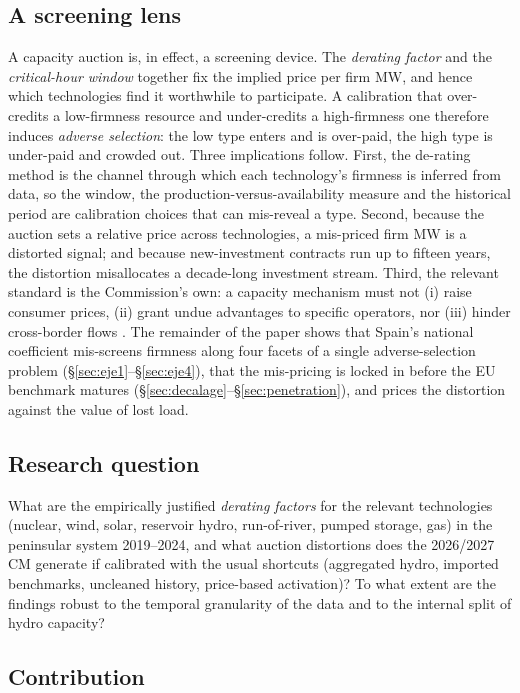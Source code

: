 \documentclass[11pt,a4paper]{article}
\begin{document}
\subsection{A screening lens}

A capacity auction is, in effect, a screening device. The \emph{derating factor} and
the \emph{critical-hour window} together fix the implied price per firm MW, and hence
which technologies find it worthwhile to participate. A calibration that over-credits a
low-firmness resource and under-credits a high-firmness one therefore induces
\emph{adverse selection}: the low type enters and is over-paid, the high type is
under-paid and crowded out. Three implications follow. First, the de-rating method is
the channel through which each technology's firmness is inferred from data, so the
window, the production-versus-availability measure and the historical period are
calibration choices that can mis-reveal a type. Second, because the auction sets a
relative price across technologies, a mis-priced firm MW is a distorted signal; and
because new-investment contracts run up to fifteen years, the distortion misallocates a
decade-long investment stream. Third, the relevant standard is the Commission's own: a
capacity mechanism must not (i) raise consumer prices, (ii) grant undue advantages to
specific operators, nor (iii) hinder cross-border flows \citep{ec2026sa112483}. The
remainder of the paper shows that Spain's national coefficient mis-screens firmness
along four facets of a single adverse-selection problem
(\S\ref{sec:eje1}--\S\ref{sec:eje4}), that the mis-pricing is locked in before the EU
benchmark matures (\S\ref{sec:decalage}--\S\ref{sec:penetration}), and prices the
distortion against the value of lost load.

\subsection{Research question}

What are the empirically justified \emph{derating factors} for the relevant
technologies (nuclear, wind, solar, reservoir hydro, run-of-river, pumped storage,
gas) in the peninsular system 2019--2024, and what auction distortions does the
2026/2027 CM generate if calibrated with the usual shortcuts (aggregated hydro, imported
benchmarks, uncleaned history, price-based activation)? To what extent are the
findings robust to the temporal granularity of the data and to the internal split
of hydro capacity?

\subsection{Contribution}
\end{document}

